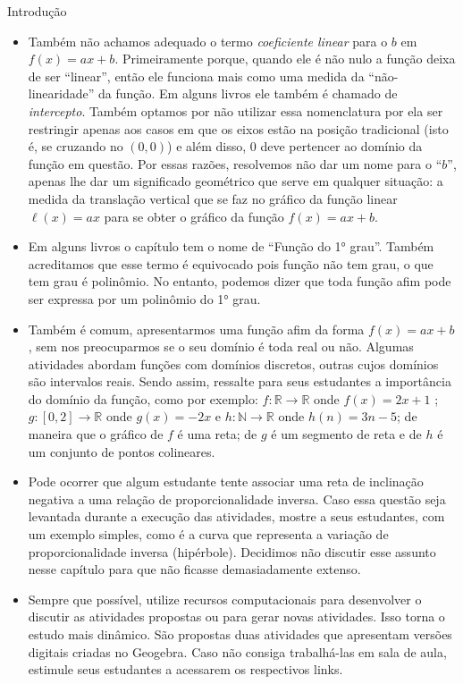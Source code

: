 \begin{apresentacao}{Introdução}
\begin{itemize}
\item {} 
Também não achamos adequado o termo \emph{coeficiente linear} para o \(b\) em \(f(x)=ax+b\). Primeiramente porque, quando ele é não nulo a função deixa de ser “linear”, então ele funciona mais como uma medida da “não-linearidade” da função. Em alguns livros ele também é chamado de \emph{intercepto}. Também optamos por não utilizar essa nomenclatura por ela ser restringir apenas aos casos em que os eixos estão na posição tradicional (isto é, se cruzando no \((0,0)\)) e além disso, \(0\) deve pertencer ao domínio da função em questão. Por essas razões, resolvemos não dar um nome para o “\(b\)”, apenas lhe dar um significado geométrico que serve em qualquer situação: a medida da translação vertical que se faz no gráfico da função linear \(\ell(x)=ax\) para se obter o gráfico da função \(f(x)=ax+b\).

\item {} 
Em alguns livros o capítulo tem o nome de “Função do 1° grau”. Também acreditamos que esse termo é equivocado pois função não tem grau, o que tem grau é polinômio. No entanto, podemos dizer que toda função afim pode ser expressa por um polinômio do 1° grau.

\clearpage
\item {} 
Também é comum, apresentarmos uma função afim da forma \(f(x)=ax+b\), sem nos preocuparmos se o seu domínio é toda real ou não. Algumas atividades abordam funções com domínios discretos, outras cujos domínios são intervalos reais. Sendo assim, ressalte para seus estudantes a importância do domínio da função, como por exemplo: \(f:\mathbb{R}\to\mathbb{R}\) onde \(f(x)=2x+1\) ; \(g:[0,2]\to \mathbb{R}\) onde \(g(x) = -2x\)   e  \(h:\mathbb{N}\to\mathbb{R}\) onde \(h(n)=3n-5\); de maneira que o gráfico de \(f\) é uma reta; de \(g\) é um segmento de reta e de \(h\) é um conjunto de pontos colineares.

\item {} 
Pode ocorrer que algum estudante tente associar uma reta de inclinação negativa a uma relação de proporcionalidade inversa. Caso essa questão seja levantada durante a execução das atividades, mostre a seus estudantes, com um exemplo simples, como é a curva que representa a variação de proporcionalidade inversa (hipérbole). Decidimos não discutir esse assunto nesse capítulo para que não ficasse demasiadamente extenso.

\item {} 
Sempre que possível, utilize recursos computacionais para desenvolver o discutir as atividades propostas ou para gerar novas atividades. Isso torna o estudo mais dinâmico.  São propostas duas atividades que apresentam versões digitais criadas no Geogebra. Caso não consiga trabalhá-las em sala de aula, estimule seus estudantes a acessarem os respectivos links.


\end{itemize}
\end{apresentacao}
